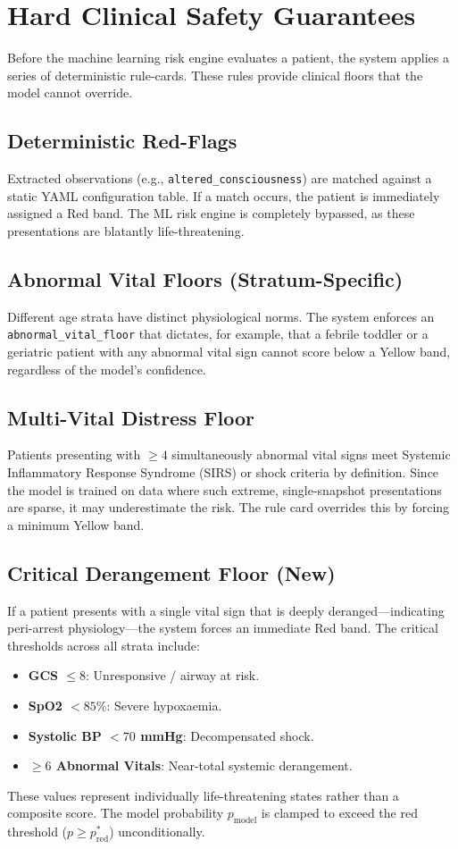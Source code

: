 \section{Hard Clinical Safety Guarantees}

Before the machine learning risk engine evaluates a patient, the system applies a series of deterministic rule-cards. These rules provide clinical floors that the model cannot override.

\subsection{Deterministic Red-Flags}
Extracted observations (e.g., \texttt{altered\_consciousness}) are matched against a static YAML configuration table. If a match occurs, the patient is immediately assigned a Red band. The ML risk engine is completely bypassed, as these presentations are blatantly life-threatening.

\subsection{Abnormal Vital Floors (Stratum-Specific)}
Different age strata have distinct physiological norms. The system enforces an \texttt{abnormal\_vital\_floor} that dictates, for example, that a febrile toddler or a geriatric patient with any abnormal vital sign cannot score below a Yellow band, regardless of the model's confidence.

\subsection{Multi-Vital Distress Floor}
Patients presenting with $\ge 4$ simultaneously abnormal vital signs meet Systemic Inflammatory Response Syndrome (SIRS) or shock criteria by definition. Since the model is trained on data where such extreme, single-snapshot presentations are sparse, it may underestimate the risk. The rule card overrides this by forcing a minimum Yellow band.

\subsection{Critical Derangement Floor (New)}
If a patient presents with a single vital sign that is deeply deranged—indicating peri-arrest physiology—the system forces an immediate Red band. The critical thresholds across all strata include:
\begin{itemize}
    \item \textbf{GCS $\le 8$}: Unresponsive / airway at risk.
    \item \textbf{SpO2 $< 85\%$}: Severe hypoxaemia.
    \item \textbf{Systolic BP $< 70$ mmHg}: Decompensated shock.
    \item \textbf{$\ge 6$ Abnormal Vitals}: Near-total systemic derangement.
\end{itemize}
These values represent individually life-threatening states rather than a composite score. The model probability $p_{\text{model}}$ is clamped to exceed the red threshold ($p \ge p^*_{\text{red}}$) unconditionally.
